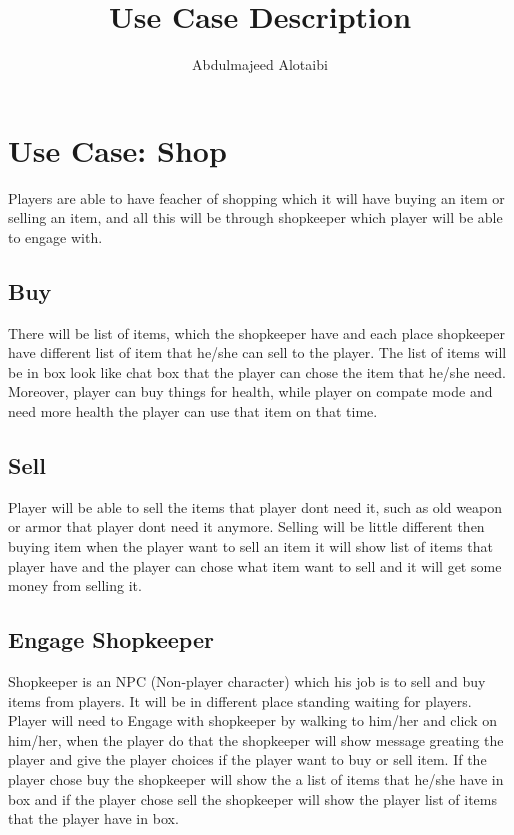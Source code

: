 \documentclass[11pt]{article}
\title{Use Case Description}
\author{Abdulmajeed Alotaibi}
\begin{document}
    \maketitle

    \section{Use Case: Shop}
	Players are able to have feacher of shopping which it will have buying an item or selling an item, and all this will be through shopkeeper which player will be able to engage with.

		\subsection{Buy}
		
			There will be list of items, which the shopkeeper have and each place shopkeeper have different list of item that he/she can sell to the player. The list of items will be in box look like chat box that the player can chose the item that he/she need. Moreover, player can buy things for health, while player on compate mode and need more health the player can use that item on that time.

		\subsection{Sell}
 
			Player will be able to sell the items that player dont need it, such as old weapon or armor that player dont need it anymore. Selling will be little different then buying item when the player want to sell an item it will show list of items that player have and the player can chose what item want to sell and it will get some money from selling it.
	
		\subsection{Engage Shopkeeper}
			Shopkeeper is an NPC (Non-player character) which his job is to sell and buy items from players. It will be in different place standing waiting for players. Player will need to Engage with shopkeeper by walking to him/her and click on him/her, when the player do that the shopkeeper will show message greating the player and give the player choices if the player want to buy or sell item. If the player chose buy the shopkeeper will show the a list of items that he/she have in box and if the player chose sell the shopkeeper will show the player list of items that the player have in box.

		
\end{document}
